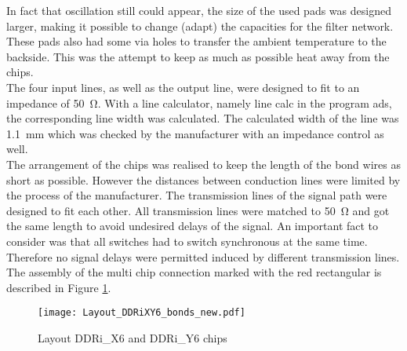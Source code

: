 In fact that oscillation still could appear, the size of the used pads was designed larger, making it possible to change (adapt) the capacities for the filter network.
These pads also had some via holes to transfer the ambient temperature to the backside.
This was the attempt to keep as much as possible heat away from the chips.\\
The four input lines, as well as the output line, were designed to fit to an impedance of \SI{50}{\ohm}.
With a line calculator, namely line calc in the program ads, the corresponding line width was calculated.
The calculated width of the line was \SI{1.1}{\milli \meter} which was checked by the manufacturer with an impedance control as well.\\
The arrangement of the chips was realised to keep the length of the bond wires as short as possible.
However the distances between conduction lines were limited by the process of the manufacturer.
The transmission lines of the signal path were designed to fit each other.
All transmission lines were matched to \SI{50}{\ohm} and got the same length to avoid undesired delays of the signal.
An important fact to consider was that all switches had to switch synchronous at the same time. 
Therefore no signal delays were permitted induced by different transmission lines.\\
The assembly of the multi chip connection marked with the red rectangular is described in Figure \ref{fig:layoutDDRiXY6bond}.

\begin{figure}[htb!]
	\centering
  \texttt{[image: Layout\_DDRiXY6\_bonds\_new.pdf]}
	\caption{Layout DDRi\_X6 and DDRi\_Y6 chips}
	\label{fig:layoutDDRiXY6bond}
\end{figure}

